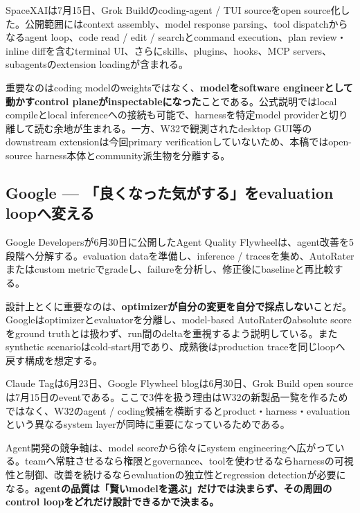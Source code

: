 SpaceXAIは7月15日、Grok Buildのcoding-agent / TUI sourceをopen source化した。公開範囲にはcontext assembly、model response parsing、tool dispatchからなるagent loop、code read / edit / searchとcommand execution、plan review・inline diffを含むterminal UI、さらにskills、plugins、hooks、MCP servers、subagentsのextension loadingが含まれる\cite{grok-build-open-source}。

重要なのはcoding modelのweightsではなく、\textbf{modelをsoftware engineerとして動かすcontrol planeがinspectableになった}ことである。公式説明ではlocal compileとlocal inferenceへの接続も可能で、harnessを特定model providerと切り離して読む余地が生まれる。一方、W32で観測されたdesktop GUI等のdownstream extensionは今回primary verificationしていないため、本稿ではopen-source harness本体とcommunity派生物を分離する。

\subsection*{Google --- 「良くなった気がする」をevaluation loopへ変える}

Google Developersが6月30日に公開したAgent Quality Flywheelは、agent改善を5段階へ分解する。evaluation dataを準備し、inference / tracesを集め、AutoRaterまたはcustom metricでgradeし、failureを分析し、修正後にbaselineと再比較する\cite{google-agent-quality-flywheel}。

設計上とくに重要なのは、\textbf{optimizerが自分の変更を自分で採点しない}ことだ。Googleはoptimizerとevaluatorを分離し、model-based AutoRaterのabsolute scoreをground truthとは扱わず、run間のdeltaを重視するよう説明している。またsynthetic scenarioはcold-start用であり、成熟後はproduction traceを同じloopへ戻す構成を想定する\cite{google-agent-quality-flywheel}。

\begin{claimboundary}
Claude Tagは6月23日、Google Flywheel blogは6月30日、Grok Build open sourceは7月15日のeventである。ここで3件を扱う理由はW32の新製品一覧を作るためではなく、W32のagent / coding候補を横断するとproduct・harness・evaluationという異なるsystem layerが同時に重要になっているためである。
\end{claimboundary}

Agent開発の競争軸は、model scoreから徐々にsystem engineeringへ広がっている。teamへ常駐させるなら権限とgovernance、toolを使わせるならharnessの可視性と制御、改善を続けるならevaluationの独立性とregression detectionが必要になる。\textbf{agentの品質は「賢いmodelを選ぶ」だけでは決まらず、その周囲のcontrol loopをどれだけ設計できるかで決まる。}
